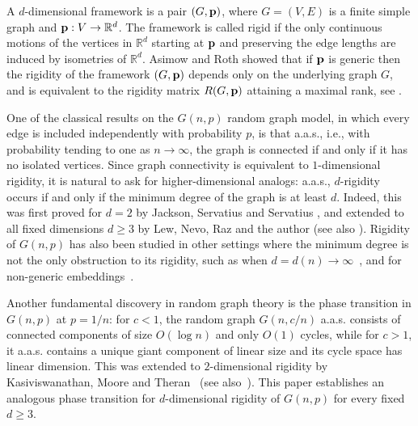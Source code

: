 \documentclass[reqno,english]{amsart}
\numberwithin{equation}{section}
\theoremstyle{definition}{
\newtheorem{example}[theorem]{Example}
\newtheorem{definition}[theorem]{Definition}
\newtheorem*{definition*}{Definition}
\newtheorem{problem}[theorem]{Problem}
\newtheorem{question}[theorem]{Question}
}
\newcommand{\R}{\mathbb R}
\newcommand{\p}{{\bf p}}
\begin{document}
A \(d\)-dimensional framework is a pair \((G,\p)\), where
\(G=(V,E)\) is a finite simple graph and \(\p:V\to\R^d\). The framework is called rigid if the only continuous motions
of the vertices in \(\R^d\) starting at \(\p\) and preserving the edge lengths are
induced by isometries of \(\R^d\). Asimow and Roth showed that if \(\p\) is generic then the rigidity of the framework \((G,\p)\) depends only
on the underlying graph \(G\), and is equivalent to the rigidity matrix \(R(G,\p)\) attaining a maximal rank, see \cite{GraverServatiusServatius1993}.

One of the classical results on the \(G(n,p)\) random graph model, in which every edge is included
independently with probability \(p\), is that a.a.s., i.e., with probability
tending to one as \(n\to\infty\), the graph is connected if and only if it
has no isolated vertices. Since graph connectivity is equivalent to
\(1\)-dimensional rigidity, it is natural to ask for higher-dimensional
analogs: a.a.s., \(d\)-rigidity occurs if and only if the
minimum degree of the graph is at least \(d\). Indeed, this was first proved for $d=2$ by Jackson, Servatius and Servatius \cite{JSS-planeThreshold}, and extended to all fixed dimensions
\(d\ge 3\) by Lew, Nevo, Raz and the author \cite{LewNevoPeledRazSharpThreshold} (see also \cite{KiralyTheranCoherence,JordanTanigawaRigidityRandomSubgraphs}). Rigidity of \(G(n,p)\) has also been studied in other
settings where the minimum degree is not the only obstruction to its rigidity,
such as when \(d=d(n)\to\infty\)~\cite{KrivelevichLewMichaeliRigidPartitions,KrivelevichCombinatorialSufficientConditions,PeledPelegHighDimensional,JordanLiuVillanyiDegreeSum}, and for non-generic embeddings~\cite{BenjaminiTzalikDetermining,GiraoIllingworthMichelPowierskiScottReconstructing,MontgomeryNenadovPortierSzaboGlobalRigidityR,ClinchHaslegraveHuynhNixonNAC}.

Another fundamental discovery in random graph theory is the phase transition in \(G(n,p)\) at \(p=1/n\): 
for \(c<1\), the random graph \(G(n,c/n)\) a.a.s. consists of connected components of size \(O(\log n)\) and only \(O(1)\) cycles,
while for \(c>1\), it a.a.s. contains a unique giant component of linear size and its cycle space has linear dimension.
This was extended to \(2\)-dimensional rigidity by 
Kasiviswanathan, Moore and Theran~\cite{KasiviswanathanMooreTheranRigidityTransition} (see also~\cite{TheranRigidComponentsRandomGraphs}). This paper establishes an analogous phase transition for \(d\)-dimensional rigidity of $G(n,p)$ for every fixed \(d\ge 3\).
\end{document}
